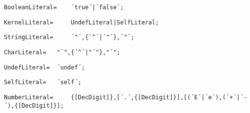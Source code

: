 \documentclass{article}
\begin{document}
    \begin{lstlisting}[mathescape=true]
     BooleanLiteral= 	´true´|´false´;
    \end{lstlisting}
    
    \begin{lstlisting}[mathescape=true]
     KernelLiteral= 	UndefLiteral|SelfLiteral;
    \end{lstlisting}
    
    \begin{lstlisting}[mathescape=true]
     StringLiteral= 	´"´,{´^´|´"´},´"´;
    \end{lstlisting}
    
    \begin{lstlisting}[mathescape=true]
     CharLiteral= 	"´",{´^´|"´"},"´";
    \end{lstlisting}
    
    \begin{lstlisting}[mathescape=true]
     UndefLiteral= 	´undef´;
    \end{lstlisting}
    
    \begin{lstlisting}[mathescape=true]
     SelfLiteral= 	´self´;
    \end{lstlisting}
    
    \begin{lstlisting}[mathescape=true]
     NumberLiteral= 	{[DecDigit]},[´.´,{[DecDigit]}],[(´E´|´e´),(´+´|´-´),{[DecDigit]}];
    \end{lstlisting}
    
\end{document}
